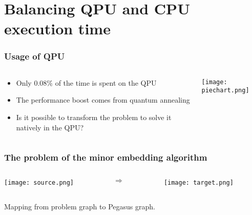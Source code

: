 \documentclass[aspectratio=169]{beamer}
\begin{document}
\section{Balancing QPU and CPU \\execution time}

\begin{frame}\frametitle{Usage of QPU}

    \begin{columns}
        \begin{column}{0.4\textwidth}
            \begin{itemize}
                \item Only 0.08\% of the time is spent on the QPU
                \item The performance boost comes from quantum annealing
                \item Is it possible to transform the problem to solve it natively in the QPU?
            \end{itemize}
        \end{column}
        \begin{column}{0.6\textwidth}
            \begin{flushright}
                \texttt{[image: piechart.png]}
            \end{flushright}
        \end{column}
    \end{columns}

\end{frame}

\begin{frame}\frametitle{The problem of the minor embedding algorithm}

    \begin{columns}
        \begin{column}{0.4\textwidth}
            \begin{flushleft}
                \texttt{[image: source.png]}
            \end{flushleft}
        \end{column}
        \begin{column}{0.1\textwidth}
            \LARGE
            $\Longrightarrow$
        \end{column}
        \begin{column}{0.4\textwidth}
            \begin{flushright}
                \texttt{[image: target.png]}
            \end{flushright}
        \end{column}
    \end{columns}

    \begin{center}
        Mapping from problem graph to Pegasus graph.
    \end{center}

\end{frame}
\end{document}
